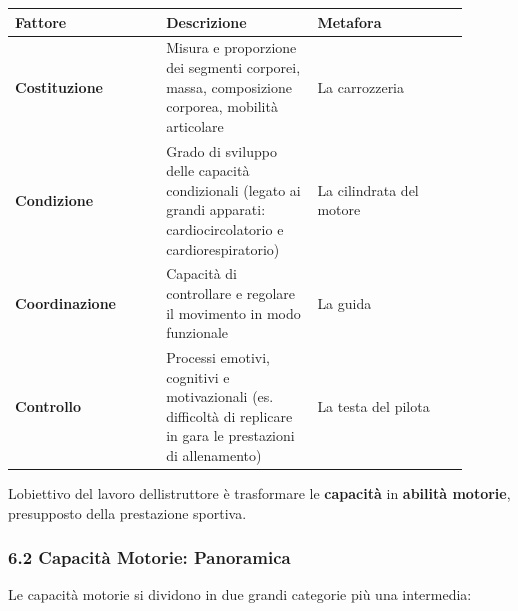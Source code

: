 \documentclass[a4paper,11pt]{article}
\begin{document}
\begin{longtable}[]{@{}p{0.30\linewidth}p{0.30\linewidth}p{0.30\linewidth}@{}}
      \toprule\noalign{}
      Fattore                                                              & Descrizione                                      & Metafora \\
      \midrule\noalign{}
      \endhead
      \bottomrule\noalign{}
      \endlastfoot
      \textbf{Costituzione}                                                & Misura e proporzione dei segmenti corporei,
      massa, composizione corporea, mobilità articolare                    & La carrozzeria                                              \\
      \textbf{Condizione}                                                  & Grado di sviluppo delle capacità condizionali
      (legato ai grandi apparati: cardiocircolatorio e cardiorespiratorio) &
      La cilindrata del motore                                                                                                           \\
      \textbf{Coordinazione}                                               & Capacità di controllare e regolare il movimento
      in modo funzionale                                                   & La guida                                                    \\
      \textbf{Controllo}                                                   & Processi emotivi, cognitivi e motivazionali (es.
      difficoltà di replicare in gara le prestazioni di allenamento)       & La
      testa del pilota                                                                                                                   \\
\end{longtable}

L\textquotesingle obiettivo del lavoro dell\textquotesingle istruttore è
trasformare le \textbf{capacità} in \textbf{abilità motorie},
presupposto della prestazione sportiva.

\subsubsection{6.2 Capacità Motorie:
      Panoramica}\label{capacituxe0-motorie-panoramica}

Le capacità motorie si dividono in due grandi categorie più una
intermedia:
\end{document}
